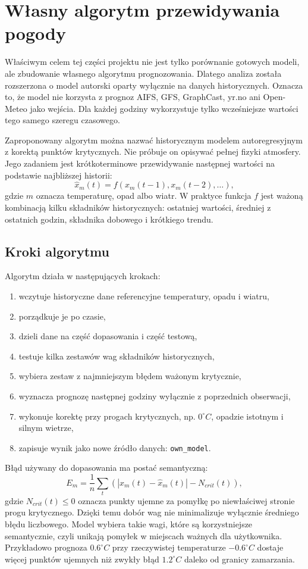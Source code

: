 \documentclass[a4paper,12pt]{article}
\begin{document}
\section{Własny algorytm przewidywania pogody}

Właściwym celem tej części projektu nie jest tylko porównanie gotowych modeli,
ale zbudowanie własnego algorytmu prognozowania. Dlatego analiza została
rozszerzona o model autorski oparty wyłącznie na danych historycznych.
Oznacza to, że model nie korzysta z prognoz AIFS, GFS, GraphCast, yr.no ani
Open-Meteo jako wejścia. Dla każdej godziny wykorzystuje tylko wcześniejsze
wartości tego samego szeregu czasowego.

Zaproponowany algorytm można nazwać historycznym modelem autoregresyjnym z
korektą punktów krytycznych. Nie próbuje on opisywać pełnej fizyki atmosfery.
Jego zadaniem jest krótkoterminowe przewidywanie następnej wartości na
podstawie najbliższej historii:
\[
\hat{x}_m(t) = f(x_m(t-1), x_m(t-2), \dots),
\]
gdzie \(m\) oznacza temperaturę, opad albo wiatr. W praktyce funkcja \(f\)
jest ważoną kombinacją kilku składników historycznych: ostatniej wartości,
średniej z ostatnich godzin, składnika dobowego i krótkiego trendu.

\subsection{Kroki algorytmu}

Algorytm działa w następujących krokach:
\begin{enumerate}
    \item wczytuje historyczne dane referencyjne temperatury, opadu i wiatru,
    \item porządkuje je po czasie,
    \item dzieli dane na część dopasowania i część testową,
    \item testuje kilka zestawów wag składników historycznych,
    \item wybiera zestaw z najmniejszym błędem ważonym krytycznie,
    \item wyznacza prognozę następnej godziny wyłącznie z poprzednich obserwacji,
    \item wykonuje korektę przy progach krytycznych, np. \(0^\circ C\), opadzie istotnym i silnym wietrze,
    \item zapisuje wynik jako nowe źródło danych: \texttt{own\_model}.
\end{enumerate}

Błąd używany do dopasowania ma postać semantyczną:
\[
E_{m} = \frac{1}{n}\sum_t \left(|x_m(t)-\hat{x}_m(t)| - N_{crit}(t)\right),
\]
gdzie \(N_{crit}(t)\leq 0\) oznacza punkty ujemne za pomyłkę po niewłaściwej
stronie progu krytycznego. Dzięki temu dobór wag nie minimalizuje wyłącznie
średniego błędu liczbowego. Model wybiera takie wagi, które są korzystniejsze
semantycznie, czyli unikają pomyłek w miejscach ważnych dla użytkownika.
Przykładowo prognoza \(0.6^\circ C\) przy rzeczywistej temperaturze
\(-0.6^\circ C\) dostaje więcej punktów ujemnych niż zwykły błąd \(1.2^\circ C\)
daleko od granicy zamarzania.
\end{document}
